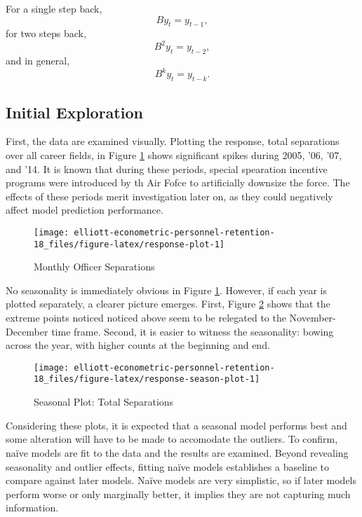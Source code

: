 \documentclass[12pt,letterpaper,toc=flat,oneside]{report}
\theoremstyle{definition}
\theoremstyle{definition}
\theoremstyle{definition}
\theoremstyle{remark}
\begin{document}
For a single step back, \[ By_t = y_{t-1}, \] for two steps back,
\[ B^2y_t = y_{t-2}, \] and in general, \[ B^ky_t = y_{t-k}. \]

\hypertarget{initial-exploration}{%
\subsection{Initial Exploration}\label{initial-exploration}}

First, the data are examined visually. Plotting the response, total
separations over all career fields, in Figure \ref{fig:response-plot}
shows significant spikes during 2005, '06, '07, and '14. It is known
that during these periods, special spearation incentive programs were
introduced by th Air Fofce to artificially downsize the force. The
effects of these periods merit investigation later on, as they could
negatively affect model prediction performance.

\begin{figure}[H]

{\centering \texttt{[image: elliott-econometric-personnel-retention-18\_files/figure-latex/response-plot-1]} 

}

\caption{Monthly Officer Separations}\label{fig:response-plot}
\end{figure}

No seasonality is immediately obvious in Figure \ref{fig:response-plot}.
However, if each year is plotted separately, a clearer picture emerges.
First, Figure \ref{fig:response-season-plot} shows that the extreme
points noticed noticed above seem to be relegated to the
November-December time frame. Second, it is easier to witness the
seasonality: bowing across the year, with higher counts at the beginning
and end.

\begin{figure}[H]

{\centering \texttt{[image: elliott-econometric-personnel-retention-18\_files/figure-latex/response-season-plot-1]} 

}

\caption{Seasonal Plot: Total Separations}\label{fig:response-season-plot}
\end{figure}

Considering these plots, it is expected that a seasonal model performs
best and some alteration will have to be made to accomodate the
outliers. To confirm, naïve models are fit to the data and the results
are examined. Beyond revealing seasonality and outlier effects, fitting
naïve models establishes a baseline to compare against later models.
Naïve models are very simplistic, so if later models perform worse or
only marginally better, it implies they are not capturing much
information.
\end{document}
